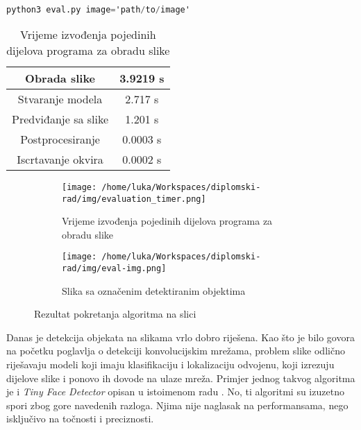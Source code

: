 \begin{center}
\begin{lstlisting}[language=Awk, caption=Poziv programa za jednu sliku]
python3 eval.py image='path/to/image'
\end{lstlisting}
\end{center}

\begin{table}[h]
\centering
\begin{tabular}{||c|c||}
\hline
\hline
	Obrada slike & 3.9219 s\\
\hline
	Stvaranje modela & 2.717 s\\
\hline
	Predviđanje sa slike & 1.201 s\\
\hline
	Postprocesiranje & 0.0003 s\\
\hline
	Iscrtavanje okvira & 0.0002 s\\
\hline
\hline
\end{tabular}
\caption{Vrijeme izvođenja pojedinih dijelova programa za obradu slike}
\label{tab:img-performance}
\end{table}

\begin{figure}[htp]
	\centering
	\begin{subfigure}[b]{0.7\linewidth}
		\texttt{[image: /home/luka/Workspaces/diplomski-rad/img/evaluation\_timer.png]}
		\caption{Vrijeme izvođenja pojedinih dijelova programa za obradu slike}
		\label{img:img-performance-terminal}
	\end{subfigure}
	\begin{subfigure}[b]{0.7\linewidth}
		\texttt{[image: /home/luka/Workspaces/diplomski-rad/img/eval-img.png]}
		\caption{Slika sa označenim detektiranim objektima}
		\label{img:img-result}
	\end{subfigure}
	\caption{Rezultat pokretanja algoritma na slici}
	\label{img:img-performance}
\end{figure}

Danas je detekcija objekata na slikama vrlo dobro riješena. Kao što je bilo govora na početku poglavlja o detekciji konvolucijskim mrežama, problem slike odlično riješavaju modeli koji imaju klasifikaciju i lokalizaciju odvojenu, koji izrezuju dijelove slike i ponovo ih dovode na ulaze mreža. Primjer jednog takvog algoritma je i \textit{Tiny Face Detector} opisan u istoimenom radu \citep{TinyFaceDetector}. No, ti algoritmi su izuzetno spori zbog gore navedenih razloga. Njima nije naglasak na performansama, nego isključivo na točnosti i preciznosti.

